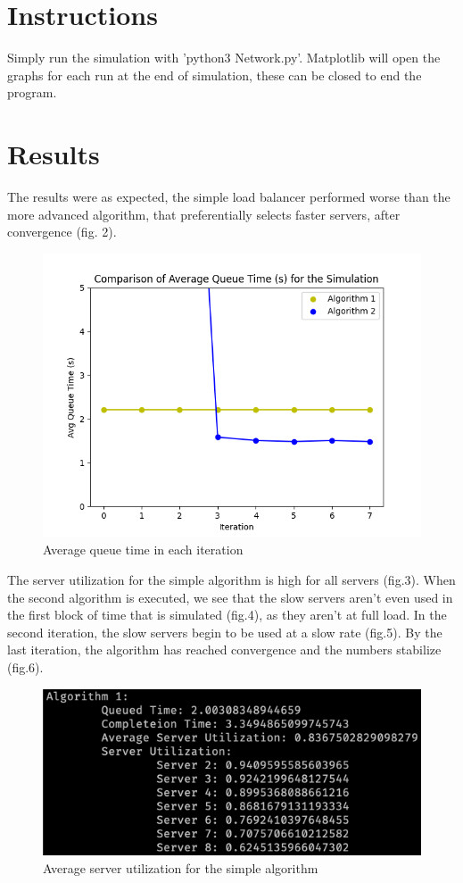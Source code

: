 \documentclass[12pt]{article}
\begin{document}
\section{Instructions}
	\par Simply run the simulation with 'python3 Network.py'. Matplotlib will open the graphs for each run at the end of simulation, these can be closed to end the program.

\section{Results}
	\par The results were as expected, the simple load balancer performed worse than the more advanced algorithm, that preferentially selects faster servers, after convergence (fig. 2).

	\begin{figure}[h]
	\centering
	\includegraphics[width=\textwidth]{queue}
	\caption{Average queue time in each iteration}
	\end{figure}

	The server utilization for the simple algorithm is high for all servers (fig.3). When the second algorithm is executed, we see that the slow servers aren't even used in the first block of time that is simulated (fig.4), as they aren't at full load. In the second iteration, the slow servers begin to be used at a slow rate (fig.5). By the last iteration, the algorithm has reached convergence and the numbers stabilize (fig.6).
	
	\begin{figure}[h]
		\centering
		\includegraphics[width=\textwidth]{alg1}
		\caption{Average server utilization for the simple algorithm}
	\end{figure}
\end{document}
